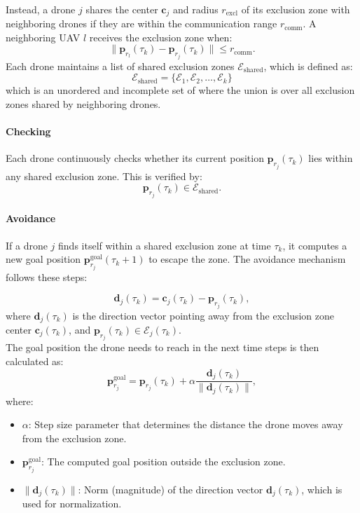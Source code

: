 \noindent
\\
Instead, a drone \( j \) shares the center \( \mathbf{c}_j \) and radius 
\( r_{\text{excl}} \) of its exclusion zone with neighboring drones 
if they are within the communication range \( r_{\text{comm}} \). 
A neighboring UAV \( l \) receives the exclusion zone when:
\[
\|\mathbf{p}_{r_l}(\tau_k) - \mathbf{p}_{r_j}(\tau_k)\| \leq r_{\text{comm}}.
\]
Each drone maintains a list of shared exclusion zones 
\( \mathcal{E}_\text{shared} \), which is defined as:
\[
\mathcal{E}_\text{shared} = \{\mathcal{E}_1, \mathcal{E}_2, \dots, \mathcal{E}_k\}
\]
which is an unordered and incomplete set of 
where the union is over all exclusion zones shared by neighboring drones.

\paragraph{Checking}
Each drone continuously checks whether its current position 
\( \mathbf{p}_{r_j}(\tau_k) \) lies within any shared exclusion zone. 
This is verified by:
\[
\mathbf{p}_{r_j}(\tau_k) \in \mathcal{E}_\text{shared}.
\]

\paragraph{Avoidance}
If a drone \( j \) finds itself within a shared exclusion zone at time \( \tau_k \), 
it computes a new goal position \( \mathbf{p}_{r_j}^{\text{goal}}(\tau_k + 1) \) 
to escape the zone. The avoidance mechanism follows these steps:

\[
\mathbf{d}_j(\tau_k) = \mathbf{c}_j(\tau_k) - \mathbf{p}_{r_j}(\tau_k),
\]
where \( \mathbf{d}_j(\tau_k) \) is the direction vector pointing away 
from the exclusion zone center \( \mathbf{c}_j(\tau_k) \), and 
\( \mathbf{p}_{r_j}(\tau_k) \in \mathcal{E}_j(\tau_k) \).
\noindent\\
The goal position the drone needs to reach in the next time steps is then calculated as:
\[
\mathbf{p}_{r_j}^{\text{goal}} = \mathbf{p}_{r_j}(\tau_k) 
+ \alpha \frac{\mathbf{d}_j(\tau_k)}{\|\mathbf{d}_j(\tau_k)\|},
\]
where:
\begin{itemize}
    \item \( \alpha \): Step size parameter that determines 
    the distance the drone moves away from the exclusion zone.
    \item \( \mathbf{p}_{r_j}^{\text{goal}} \): The computed 
    goal position outside the exclusion zone.
    \item \( \|\mathbf{d}_j(\tau_k)\| \): Norm (magnitude) of the direction 
    vector \( \mathbf{d}_j(\tau_k) \), which is used for normalization.
\end{itemize}

